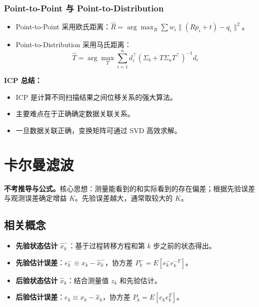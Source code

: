 \documentclass[11pt,a4paper]{article}
\begin{document}
\subsubsection*{Point-to-Point 与 Point-to-Distribution}
\begin{itemize}
  \item Point-to-Point 采用欧氏距离：$\hat{R}=\arg\max_R \sum w_i\|(Rp_i+t)-q_i\|^2$。
  \item Point-to-Distribution 采用马氏距离：
  \[
  \hat{T}=\arg\max_T\sum_{i=1}^n d_i^\top(\Sigma_b+T\Sigma_a T^\top)^{-1}d_i
  \]
\end{itemize}

\begin{notebox}
\textbf{ICP 总结：}
\begin{itemize}
  \item ICP 是计算不同扫描结果之间位移关系的强大算法。
  \item 主要难点在于正确确定数据关联关系。
  \item 一旦数据关联正确，变换矩阵可通过 SVD 高效求解。
\end{itemize}
\end{notebox}

\section{卡尔曼滤波}

\begin{keypoint}
\textbf{不考推导与公式。}核心思想：测量能看到的和实际看到的存在偏差；根据先验误差与观测误差确定增益 $K$。先验误差越大，通常取较大的 $K$。
\end{keypoint}

\subsection{相关概念}

\begin{itemize}
  \item \textbf{先验状态估计} $\hat{x}^-_k$：基于过程转移方程和第 $k$ 步之前的状态得出。
  \item \textbf{先验估计误差}：$e^-_k \equiv x_k - \hat{x}^-_k$，协方差 $P^-_k = E[e^-_k e^{-T}_k]$。
  \item \textbf{后验状态估计} $\hat{x}_k$：结合测量值 $z_k$ 和先验估计。
  \item \textbf{后验估计误差}：$e_k \equiv x_k - \hat{x}_k$，协方差 $P_k = E[e_k e^T_k]$。
\end{itemize}
\end{document}
